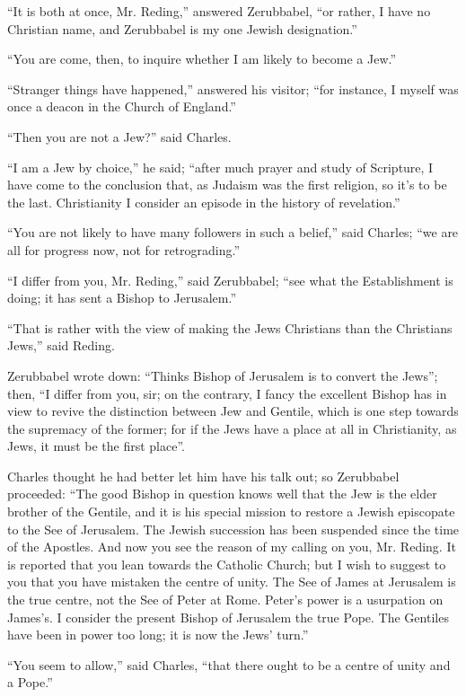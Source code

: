 ``It is both at once, Mr. Reding,'' answered Zerubbabel,
``or rather, I have no Christian name, and Zerubbabel is my one
Jewish designation.''

``You are come, then, to inquire whether I am likely to become
a Jew.''

``Stranger things have happened,'' answered his visitor;
``for instance, I myself was once a deacon in the Church of
England.''

``Then you are not a Jew?'' said Charles.

``I am a Jew by choice,'' he said; ``after much prayer
and study of Scripture, I have come to the conclusion that, as Judaism
was the first religion, so it's to be the last. Christianity I
consider an episode in the history of revelation.''

``You are not likely to have many followers in such a
belief,'' said Charles; ``we are all for progress now, not for
retrograding.''

``I differ from you, Mr. Reding,'' said Zerubbabel;
``see what the Establishment is doing; it has sent a Bishop to
Jerusalem.''

``That is rather with the view of making the Jews Christians
than the Christians Jews,'' said Reding.

Zerubbabel wrote down: ``Thinks Bishop of Jerusalem is to
convert the Jews''; then, ``I differ from you, sir; on the
contrary, I fancy the excellent Bishop has in view to revive the
distinction between Jew and Gentile, which is one step towards the
supremacy of the former; for if the Jews have a place at all in
Christianity, as Jews, it must be the first place''.

Charles thought he had better let him have his talk out; so
Zerubbabel proceeded: ``The good Bishop in question knows well
that the Jew is the elder brother of the Gentile, and it is his
special mission to restore a Jewish episcopate to the See of
Jerusalem. The Jewish succession has been suspended since the time of
the Apostles. And now you see the reason of my calling on you, Mr.
Reding. It is reported that you lean towards the Catholic Church; but
I wish to suggest to you that you have mistaken the centre of unity.
The See of James at Jerusalem is the true centre, not the See of
Peter at Rome. Peter's power is a usurpation on James's. I consider
the present Bishop of Jerusalem the true Pope. The Gentiles have been
in power too long; it is now the Jews' turn.''

``You seem to allow,'' said Charles, ``that there ought
to be a centre of unity and a Pope.''

